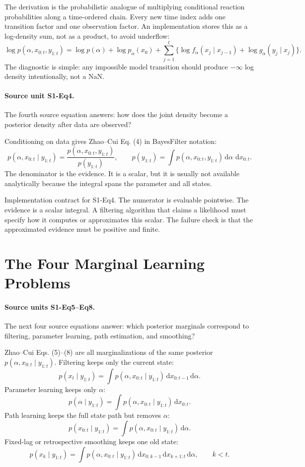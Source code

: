 \documentclass[11pt]{article}
\newcommand{\dd}{\,\mathrm d}
\begin{document}
The derivation is the probabilistic analogue of multiplying conditional
reaction probabilities along a time-ordered chain.  Every new time index adds
one transition factor and one observation factor.  An implementation stores
this as a log-density sum, not as a product, to avoid underflow:
\[
    \log p(\alpha,x_{0:t},y_{1:t})
    =
    \log p(\alpha)+\log p_\alpha(x_0)
    +
    \sum_{j=1}^t
    \{\log f_\alpha(x_j\mid x_{j-1})+\log g_\alpha(y_j\mid x_j)\}.
    \tag{BF-3a}
\]
The diagnostic is simple: any impossible model transition should produce
\(-\infty\) log density intentionally, not a NaN.

\paragraph{Source unit S1-Eq4.}
The fourth source equation answers: how does the joint density become a
posterior density after data are observed?

Conditioning on data gives Zhao--Cui Eq. (4) in BayesFilter notation:
\[
    p(\alpha,x_{0:t}\mid y_{1:t})
    =
    \frac{p(\alpha,x_{0:t},y_{1:t})}
    {p(y_{1:t})},
    \qquad
    p(y_{1:t})
    =
    \int p(\alpha,x_{0:t},y_{1:t})
    \dd\alpha\,\dd x_{0:t}.
    \tag{BF-4}
\]
The denominator is the evidence.  It is a scalar, but it is usually not
available analytically because the integral spans the parameter and all states.

Implementation contract for S1-Eq4.  The numerator is evaluable pointwise.  The
evidence is a scalar integral.  A filtering algorithm that claims a likelihood
must specify how it computes or approximates this scalar.  The failure check is
that the approximated evidence must be positive and finite.

\section{The Four Marginal Learning Problems}

\paragraph{Source units S1-Eq5--Eq8.}
The next four source equations answer: which posterior marginals correspond to
filtering, parameter learning, path estimation, and smoothing?

Zhao--Cui Eqs. (5)--(8) are all marginalizations of the same posterior
\(p(\alpha,x_{0:t}\mid y_{1:t})\).  Filtering keeps only the current state:
\[
    p(x_t\mid y_{1:t})
    =
    \int p(\alpha,x_{0:t}\mid y_{1:t})
    \dd x_{0:t-1}\dd\alpha .
    \tag{BF-5}
\]
Parameter learning keeps only \(\alpha\):
\[
    p(\alpha\mid y_{1:t})
    =
    \int p(\alpha,x_{0:t}\mid y_{1:t})\dd x_{0:t}.
    \tag{BF-6}
\]
Path learning keeps the full state path but removes \(\alpha\):
\[
    p(x_{0:t}\mid y_{1:t})
    =
    \int p(\alpha,x_{0:t}\mid y_{1:t})\dd\alpha .
    \tag{BF-7}
\]
Fixed-lag or retrospective smoothing keeps one old state:
\[
    p(x_k\mid y_{1:t})
    =
    \int p(\alpha,x_{0:t}\mid y_{1:t})
    \dd x_{0:k-1}\dd x_{k+1:t}\dd\alpha ,
    \qquad k<t .
    \tag{BF-8}
\]
\end{document}
